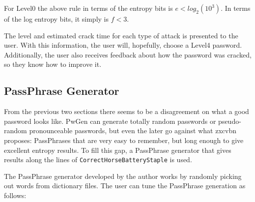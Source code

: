 For Level0 the above rule in terms of the entropy bits is $e<log_{2}(10^{3})$.
In terms of the log entropy bits, it simply is $f<3$.

The level and estimated crack time for each type of attack is presented to the user. With this information, the user will, hopefully, choose a Level4 password. Additionally, the user also receives  feedback about how the password was cracked, so they know how to improve it.

\subsection{PassPhrase Generator}

From the previous two sections there seems to be a disagreement on what a good password looks like. PwGen can generate totally random passwords or pseudo-random pronounceable passwords, but even the later go against what zxcvbn proposes: PassPhrases that are very easy to remember, but long enough to give excellent entropy results. To fill this gap, a PassPhrase generator that gives results along the lines of \texttt{CorrectHorseBatteryStaple} is used.

The PassPhrase generator developed by the author works by randomly picking out words from dictionary files. The user can tune the PassPhrase generation as follows:

